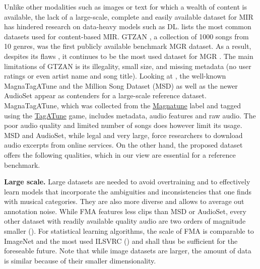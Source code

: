\documentclass{article}
\begin{document}
Unlike other modalities such as images or text for which a wealth of content is available, the lack of a large-scale, complete and easily available dataset for MIR has hindered research on data-heavy models such as DL.
 lists the most common datasets used for content-based MIR.
GTZAN \cite{gtzan}, a collection of 1000 songs from 10 genres, was the first publicly available benchmark MGR dataset. As a result, despites its flaws \cite{gtzan_critic_1}, it continues to be the most used dataset for MGR \cite{mgr_eval}. The main limitations of GTZAN is its illegality, small size, and missing metadata (no user ratings or even artist name and song title). %
Looking at , the well-known MagnaTagATune and the Million Song Dataset (MSD) as well as the newer AudioSet appear as contenders for a large-scale reference dataset. %
MagnaTagATune, which was collected from the \href{https://magnatune.com/}{Magnatune} label and tagged using the \href{http://tagatune.org/}{TagATune} game, includes metadata, audio features and raw audio. The poor audio quality and limited number of songs does however limit its usage.
MSD and AudioSet, while legal and very large, force researchers to download audio excerpts from online services.
On the other hand, the proposed dataset offers the following qualities, which in our view are essential for a reference benchmark.

\textbf{Large scale.} Large datasets are needed to avoid overtraining and to effectively learn models that incorporate the ambiguities and inconsistencies that one finds with musical categories. They are also more diverse and allows to average out annotation noise.
While FMA features less clips than MSD or AudioSet, every other dataset with readily available quality audio are two orders of magnitude smaller ().
For statistical learning algorithms, the scale of FMA is comparable to ImageNet and the most used ILSVRC () and shall thus be sufficient for the foreseable future.
Note that while image datasets are larger, the amount of data is similar because of their smaller dimensionality.
\end{document}
